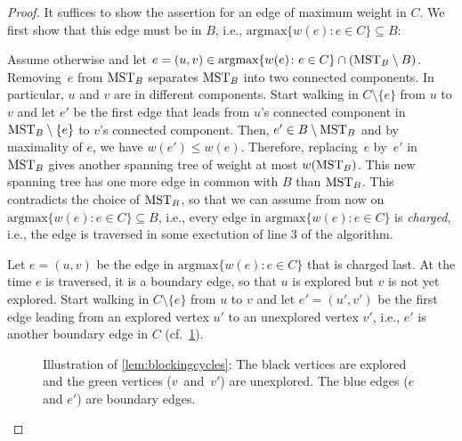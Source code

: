 \documentclass[a4paper,cleveref, autoref, thm-restate, thm-restate, UKenglish]{lipics-v2021}
\newcommand{\argmax}{\text{argmax}}
\renewcommand{\subset}{\subseteq}
\begin{document}
\begin{proof}
It suffices to show the assertion for an edge of maximum weight in $C$. 
We first show that this edge must be in $B$, i.e., $\argmax \{w(e)\colon e \in C \} \subset B$: 

Assume otherwise and let $e=(u,v) \in \argmax \{w(e)\colon e \in C \} \cap (\mstb \setminus B)$. 
Removing~$e$ from $\mathrm{MST}_B$ separates $\mathrm{MST}_B$ into two connected components. 
In particular, $u$ and $v$ are in different components. 
Start walking in $C \setminus \{e\}$ from $u$ to $v$ and let $e'$ be the first edge that leads from $u$'s connected component in $\mathrm{MST}_B \setminus \{e\}$ to $v$'s connected component. Then, $e' \in B \setminus \mathrm{MST}_B$ and by maximality of $e$, we have $w(e')\leq w(e)$. 
Therefore, replacing~$e$ by~$e'$ in $\mathrm{MST}_B$ gives another spanning tree of weight at most $w(\mathrm{MST}_B)$. This new spanning tree has one more edge in common with $B$ than $\mathrm{MST}_B$. This contradicts the choice of $\mathrm{MST}_B$, so that we can assume from now on  $\argmax \{w(e)\colon e \in C \} \subseteq B$, i.e., every edge in $\argmax \{w(e)\colon e \in C \}$ is \emph{charged}, i.e., the edge is traversed in some exectution of line 3 of the algorithm.

Let $e=(u,v)$ be the edge in $\argmax \{w(e)\colon e \in C \}$ that is charged last. At the time $e$ is traversed, it is a boundary edge, so that $u$ is explored but $v$ is not yet explored. Start walking in $C \setminus \{e\}$ from $u$ to $v$ and let $e'=(u',v')$ be the first edge leading from an explored vertex $u'$ to an unexplored vertex $v'$, i.e., $e'$ is another boundary edge in $C$ (cf.~\cref{fig:blockingcycles}).

\setlength{\belowcaptionskip}{-10pt}
\begin{figure}
\begin{center}
\end{center}
\caption{Illustration of \cref{lem:blockingcycles}: The black vertices are explored and the green vertices ($v$~and~$v'$) are unexplored. The blue edges ($e$ and $e'$) are boundary edges.}\label{fig:blockingcycles}
\end{figure}


\end{proof}
\end{document}
